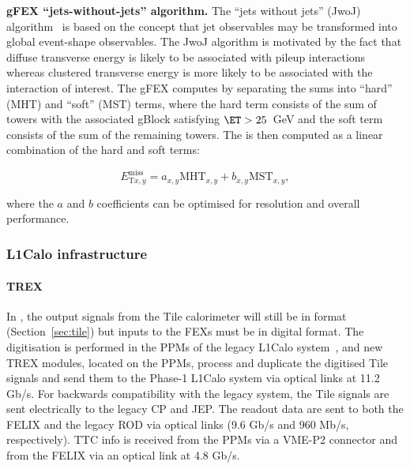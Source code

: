 \documentclass[cernpreprint, atlasdraft=false, UKenglish,british,orcidlogo, texmf, orcidlogo]{atlasdoc}
\begin{document}
\textbf{\gls{gFEX} ``jets-without-jets'' \MET algorithm.}  The ``jets without jets'' (JwoJ) algorithm~\cite{JetsWithoutJets} is based on the concept that jet observables may be transformed into global event-shape observables.
The JwoJ algorithm is motivated by the fact that
diffuse transverse energy  is likely to be associated with pileup interactions whereas clustered transverse energy is more likely to be associated with the interaction of interest.
The \gls{gFEX} computes \MET by separating the \ET sums into ``hard'' (MHT) and ``soft'' (MST) terms, where the hard term consists of the \ET sum of towers with the associated gBlock satisfying $\ET > 25$~GeV and the soft term consists of the \ET sum of the remaining towers.  The \MET is then computed as a linear combination of the hard and soft terms:
 
\begin{equation}E_{\mathrm{T} x,y}^{\mathrm{miss}} = a_{x,y}{\mathrm{MHT}}_{x,y} + b_{x,y}{\mathrm{MST}}_{x,y},\end{equation}
 
where the $a$ and $b$ coefficients can be optimised for resolution and overall performance.
 
 
\subsubsection{L1Calo infrastructure}\label{sec:TDAQ_L1CaloInfrastructure}
 
\paragraph{TREX} 
In \RunThr, the output signals from the Tile calorimeter will still be in \analog format (Section~\ref{sec:tile}) but inputs to the \glspl{FEX} must be in digital format.  The digitisation is performed in the \glspl{PPM} of the legacy \gls{L1Calo} system~\cite{TDAQ-2019-01}, and new \gls{TREX} modules, located on the \glspl{PPM}, process and duplicate the digitised Tile signals and send them to the Phase-1 \gls{L1Calo} system via optical links at 11.2 Gb/s.  For backwards compatibility with the legacy system, the Tile signals are sent electrically to the legacy \gls{CP} and \gls{JEP}.  The readout data are sent to both the \gls{FELIX} and the legacy \gls{ROD} via optical links (9.6 Gb/s and 960 Mb/s, respectively).  \gls{TTC} info is received from the \glspl{PPM} via a \gls{VME}-P2 connector and from the \gls{FELIX} via an optical link at 4.8 Gb/s.
 
\end{document}
